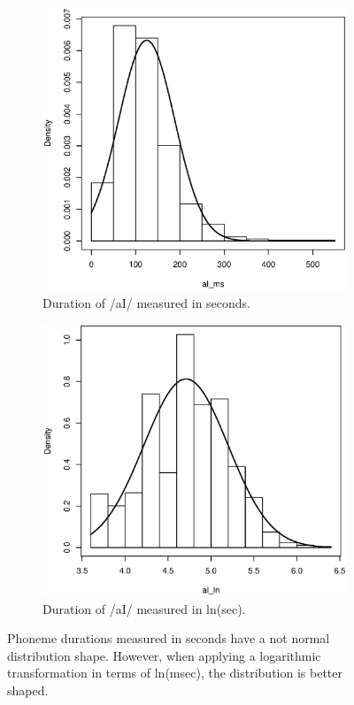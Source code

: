 \documentclass[a4paper]{scrreprt}
\begin{document}
\begin{figure}[htbp]
\centering
	\begin{subfigure}[h]{0.45\textwidth}
	\centering
	\includegraphics[width=\textwidth]{../Graphen/Hist_aims_no_title.eps}
	\caption{Duration of /aI/ measured in seconds.}
	\label{fig:ai_ms}
	\end{subfigure}
\hfill
	\begin{subfigure}[h]{0.45\textwidth}
	\centering
	\includegraphics[width=\textwidth]{../Graphen/Hist_ailn_no_title.eps}
	\caption{Duration of /aI/ measured in ln(sec).}
	\label{fig:ai_ln}
	\end{subfigure}
\caption[Phoneme duration distribution ms vs ln(ms)]{Phoneme durations measured in seconds have a not normal distribution shape. However, when applying a logarithmic transformation in terms of ln(msec), the distribution is better shaped.}
\label{fig:aI_distrib}
\end{figure}
\end{document}
